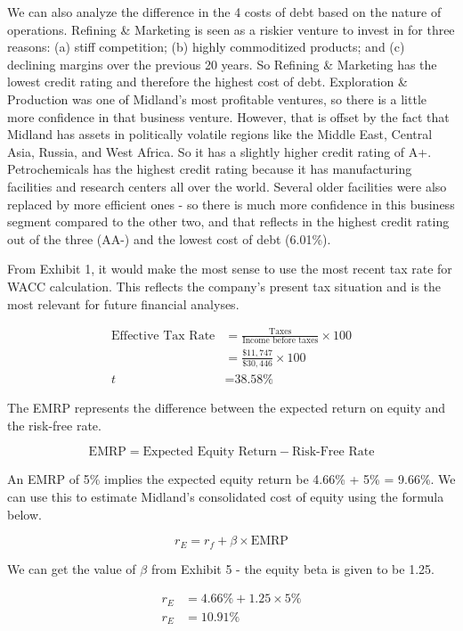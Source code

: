 \documentclass[letterpaper]{article}
\begin{document}
We can also analyze the difference in the 4 costs of debt based on the nature of operations. Refining \& Marketing is seen as a riskier venture to invest in for three reasons: (a) stiff competition; (b) highly commoditized products; and (c) declining margins over the previous 20 years. So Refining \& Marketing has the lowest credit rating and therefore the highest cost of debt. Exploration \& Production was one of Midland's most profitable ventures, so there is a little more confidence in that business venture. However, that is offset by the fact that Midland has assets in politically volatile regions like the Middle East, Central Asia, Russia, and West Africa. So it has a slightly higher credit rating of A+. Petrochemicals has the highest credit rating because it has manufacturing facilities and research centers all over the world. Several older facilities were also replaced by more efficient ones - so there is much more confidence in this business segment compared to the other two, and that reflects in the highest credit rating out of the three (AA-) and the lowest cost of debt (6.01\%).

From Exhibit 1, it would make the most sense to use the most recent tax rate for WACC calculation. This reflects the company's present tax situation and is the most relevant for future financial analyses.

\begin{align*}
\text{Effective Tax Rate} &= \frac{\text{Taxes}}{\text{Income before taxes}} \times 100 \\
&= \frac{\$11,747}{\$30,446} \times 100 \\
t &= \text{38.58\%}
\end{align*}

The EMRP represents the difference between the expected return on equity and the risk-free rate. 

\[
\text{EMRP} = \text{Expected Equity Return} - \text{Risk-Free Rate}
\]

An EMRP of 5\% implies the expected equity return be 4.66\% + 5\% = 9.66\%. We can use this to estimate Midland's consolidated cost of equity using the formula below.

\[
r_E = r_f + \beta \times \text{EMRP}
\]

We can get the value of $\beta$ from Exhibit 5 - the equity beta is given to be 1.25.

\begin{align*}
r_E &= 4.66\% + 1.25 \times 5\% \\
r_E &= 10.91\%
\end{align*}
\end{document}
